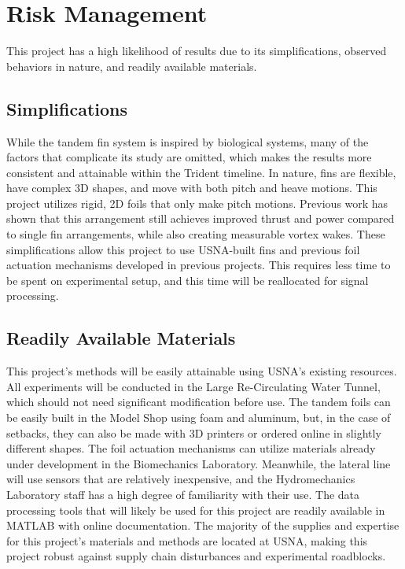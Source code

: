 \section{Risk Management}
    This project has a high likelihood of results due to its simplifications, observed behaviors in nature, and readily available materials.
    
\subsection{Simplifications}
    While the tandem fin system is inspired by biological systems, many of the factors that complicate its study are omitted, which makes the results more consistent and attainable within the Trident timeline. In nature, fins are flexible, have complex 3D shapes, and move with both pitch and heave motions. This project utilizes rigid, 2D foils that only make pitch motions. Previous work has shown that this arrangement still achieves improved thrust and power compared to single fin arrangements, while also creating measurable vortex wakes. These simplifications allow this project to use USNA-built fins and previous foil actuation mechanisms developed in previous projects. This requires less time to be spent on experimental setup, and this time will be reallocated for signal processing.
    
\subsection{Readily Available Materials}
    This project's methods will be easily attainable using USNA's existing resources. All experiments will be conducted in the Large Re-Circulating Water Tunnel, which should not need significant modification before use. The tandem foils can be easily built in the Model Shop using foam and aluminum, but, in the case of setbacks, they can also be made with 3D printers or ordered online in slightly different shapes. The foil actuation mechanisms can utilize materials already under development in the Biomechanics Laboratory. Meanwhile, the lateral line will use sensors that are relatively inexpensive, and the Hydromechanics Laboratory staff has a high degree of familiarity with their use. The data processing tools that will likely be used for this project are readily available in MATLAB with online documentation. The majority of the supplies and expertise for this project's materials and methods are located at USNA, making this project robust against supply chain disturbances and experimental roadblocks.
        
